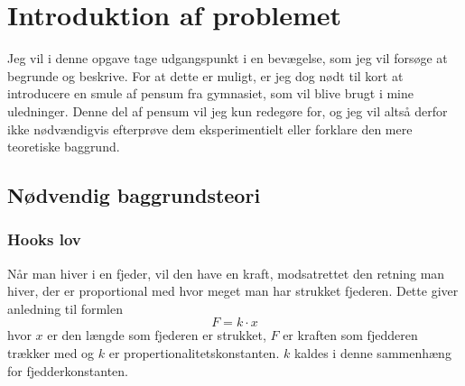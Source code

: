 \chapter{Introduktion af problemet}
Jeg vil i denne opgave tage udgangspunkt i en bevægelse, som jeg vil forsøge at begrunde og beskrive. 
For at dette er muligt, er jeg dog nødt til kort at introducere en smule af pensum fra gymnasiet, som vil blive brugt i mine uledninger. 
Denne del af pensum vil jeg kun redegøre for, og jeg vil altså derfor ikke nødvændigvis efterprøve dem eksperimentielt eller forklare den mere teoretiske baggrund. 

\section{Nødvendig baggrundsteori}
\subsection{Hooks lov}\label{teori:Hooks lov}
Når man hiver i en fjeder, vil den have en kraft, modsatrettet den retning man hiver, der er proportional med hvor meget man har strukket fjederen. 
Dette giver anledning til formlen 
$$F =k\cdot x$$
hvor $x$ er den længde som fjederen er strukket, $F$ er kraften som fjedderen trækker med og $k$ er propertionalitetskonstanten. 
$k$ kaldes i denne sammenhæng for fjedderkonstanten.